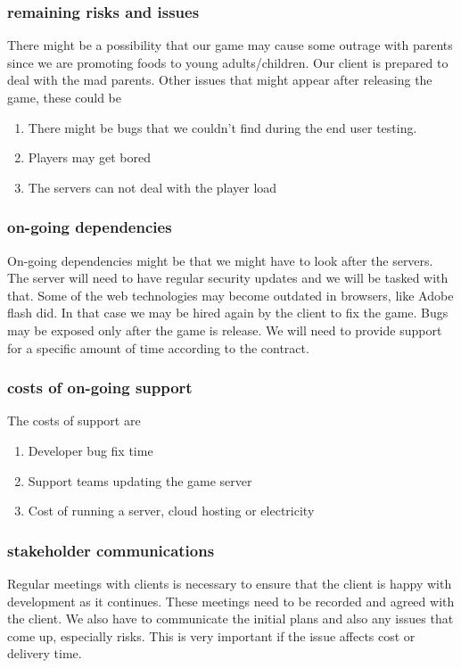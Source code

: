 \documentclass{article}
\begin{document}
\subsubsection{remaining risks and issues}
There might be a possibility that our game may cause some outrage with parents since we are promoting foods to young adults/children. Our client is prepared to deal with the mad parents. Other issues that might appear after releasing the game, these could be
\begin{enumerate}
	\item There might be bugs that we couldn't find during the end user testing. 
	\item Players may get bored
	\item The servers can not deal with the player load
\end{enumerate}

\subsubsection{on-going dependencies}
On-going dependencies might be that we might have to look after the servers. The server will need to have regular security updates and we will be tasked with that.
Some of the web technologies may become outdated in browsers, like Adobe flash did. In that case we may be hired again by the client to fix the game.
Bugs may be exposed only after the game is release. We will need to provide support for a specific amount of time according to the contract.


\subsubsection{costs of on-going support}
The costs of support are
\begin{enumerate}
	\item Developer bug fix time
	\item Support teams updating the game server
	\item Cost of running a server, cloud hosting or electricity
\end{enumerate}	

\subsubsection{stakeholder communications}
Regular meetings with clients is necessary to ensure that the client is happy with development as it continues. These meetings need to be recorded and agreed with the client.
We also have to communicate the initial plans and also any issues that come up, especially risks. This is very important if the issue affects cost or delivery time.
\end{document}
